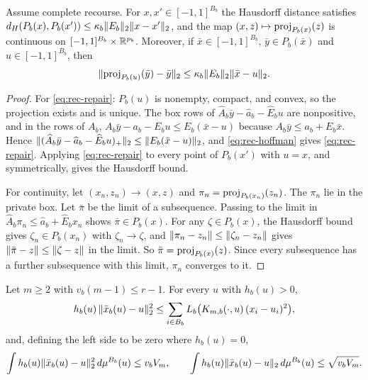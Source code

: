 \begin{lemma}\label{lem:rec-hoffman}
Assume complete recourse. For $x,x'\in[-1,1]^{B_b}$ the Hausdorff distance
satisfies $d_H(P_b(x),P_b(x'))\le\kappa_b\lVert E_b\rVert_2\lVert x-x'\rVert_2$, and the
map $(x,z)\mapsto\operatorname{proj}_{P_b(x)}(z)$ is continuous on
$[-1,1]^{B_b}\times\mathbb{R}^{p_b}$. Moreover, if $\bar x\in[-1,1]^{B_b}$,
$\bar y\in P_b(\bar x)$ and $u\in[-1,1]^{B_b}$, then
\begin{equation}\label{eq:rec-repair}
  \lVert \operatorname{proj}_{P_b(u)}(\bar y)-\bar y\rVert_2\le\kappa_b\lVert E_b\rVert_2
  \lVert \bar x-u\rVert_2 .
\end{equation}
\end{lemma}

\begin{proof}
For \eqref{eq:rec-repair}: $P_b(u)$ is nonempty, compact, and convex, so the
projection exists and is unique. The box rows of $\widehat A_b\bar y-
\widehat a_b-\widehat E_bu$ are nonpositive, and in the rows of $A_b$,
$A_b\bar y-a_b-E_bu\le E_b(\bar x-u)$ because $A_b\bar y\le a_b+E_b\bar x$.
Hence $\lVert (\widehat A_b\bar y-\widehat a_b-\widehat E_bu)_+\rVert_2\le
\lVert E_b(\bar x-u)\rVert_2$, and \eqref{eq:rec-hoffman} gives
\eqref{eq:rec-repair}. Applying \eqref{eq:rec-repair} to every point of
$P_b(x')$ with $u=x$, and symmetrically, gives the Hausdorff bound.

For continuity, let $(x_n,z_n)\to(x,z)$ and $\pi_n=\operatorname{proj}_{P_b(x_n)}(z_n)$.
The $\pi_n$ lie in the private box. Let $\bar\pi$ be the limit of a
subsequence. Passing to the limit in $\widehat A_b\pi_n\le\widehat a_b+
\widehat E_bx_n$ shows $\bar\pi\in P_b(x)$. For any $\zeta\in P_b(x)$, the
Hausdorff bound gives $\zeta_n\in P_b(x_n)$ with $\zeta_n\to\zeta$, and
$\lVert \pi_n-z_n\rVert\le\lVert \zeta_n-z_n\rVert$ gives $\lVert \bar\pi-z\rVert\le
\lVert \zeta-z\rVert$ in the limit. So $\bar\pi=\operatorname{proj}_{P_b(x)}(z)$. Since every
subsequence has a further subsequence with this limit, $\pi_n$ converges to
it.
\end{proof}

\begin{lemma}\label{lem:rec-displacement}
Let $m\ge2$ with $v_b(m-1)\le r-1$. For every $u$ with $h_b(u)>0$,
\begin{equation}\label{eq:rec-cs-displacement}
  h_b(u)\,\lVert \bar x_b(u)-u\rVert_2^2\le\sum_{i\in B_b}
  L_b\bigl(K_{m,b}(\cdot,u)\,(x_i-u_i)^2\bigr),
\end{equation}
and, defining the left side to be zero where $h_b(u)=0$,
\[
  \int h_b(u)\lVert \bar x_b(u)-u\rVert_2^2\,d\mu^{B_b}(u)\le v_bV_m,\qquad
  \int h_b(u)\lVert \bar x_b(u)-u\rVert_2\,d\mu^{B_b}(u)\le\sqrt{v_bV_m}.
\]
\end{lemma}

